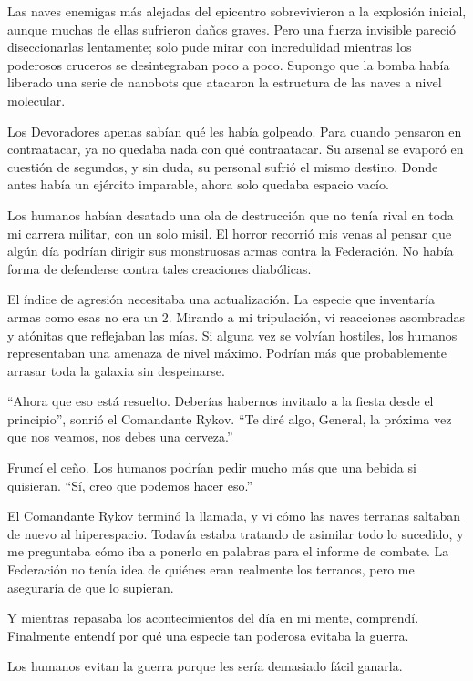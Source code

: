 Las naves enemigas más alejadas del epicentro sobrevivieron a la explosión inicial, aunque muchas de ellas sufrieron daños graves. Pero una fuerza invisible pareció diseccionarlas lentamente; solo pude mirar con incredulidad mientras los poderosos cruceros se desintegraban poco a poco. Supongo que la bomba había liberado una serie de nanobots que atacaron la estructura de las naves a nivel molecular.

Los Devoradores apenas sabían qué les había golpeado. Para cuando pensaron en contraatacar, ya no quedaba nada con qué contraatacar. Su arsenal se evaporó en cuestión de segundos, y sin duda, su personal sufrió el mismo destino. Donde antes había un ejército imparable, ahora solo quedaba espacio vacío.

Los humanos habían desatado una ola de destrucción que no tenía rival en toda mi carrera militar, con un solo misil. El horror recorrió mis venas al pensar que algún día podrían dirigir sus monstruosas armas contra la Federación. No había forma de defenderse contra tales creaciones diabólicas.

El índice de agresión necesitaba una actualización. La especie que inventaría armas como esas no era un 2. Mirando a mi tripulación, vi reacciones asombradas y atónitas que reflejaban las mías. Si alguna vez se volvían hostiles, los humanos representaban una amenaza de nivel máximo. Podrían más que probablemente arrasar toda la galaxia sin despeinarse.

``Ahora que eso está resuelto. Deberías habernos invitado a la fiesta desde el principio'', sonrió el Comandante Rykov. ``Te diré algo, General, la próxima vez que nos veamos, nos debes una cerveza.''

Fruncí el ceño. Los humanos podrían pedir mucho más que una bebida si quisieran. ``Sí, creo que podemos hacer eso.''

El Comandante Rykov terminó la llamada, y vi cómo las naves terranas saltaban de nuevo al hiperespacio. Todavía estaba tratando de asimilar todo lo sucedido, y me preguntaba cómo iba a ponerlo en palabras para el informe de combate. La Federación no tenía idea de quiénes eran realmente los terranos, pero me aseguraría de que lo supieran.

Y mientras repasaba los acontecimientos del día en mi mente, comprendí. Finalmente entendí por qué una especie tan poderosa evitaba la guerra.

Los humanos evitan la guerra porque les sería demasiado fácil ganarla.